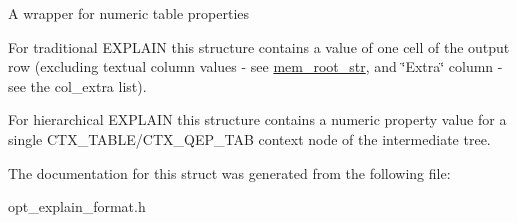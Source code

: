 A wrapper for numeric table properties

For traditional E\+X\+P\+L\+A\+IN this structure contains a value of one cell of the output row (excluding textual column values -\/ see \mbox{\hyperlink{structqep__row_1_1mem__root__str}{mem\+\_\+root\+\_\+str}}, and \char`\"{}\+Extra\char`\"{} column -\/ see the col\+\_\+extra list).

For hierarchical E\+X\+P\+L\+A\+IN this structure contains a numeric property value for a single C\+T\+X\+\_\+\+T\+A\+B\+L\+E/\+C\+T\+X\+\_\+\+Q\+E\+P\+\_\+\+T\+AB context node of the intermediate tree. 

The documentation for this struct was generated from the following file\+:\begin{DoxyCompactItemize}
\item 
opt\+\_\+explain\+\_\+format.\+h\end{DoxyCompactItemize}
